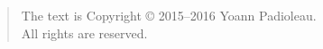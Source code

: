 \begin{quote}
The text is Copyright \copyright{} 2015--2016 Yoann Padioleau.\\
All rights are reserved.
\end{quote}

